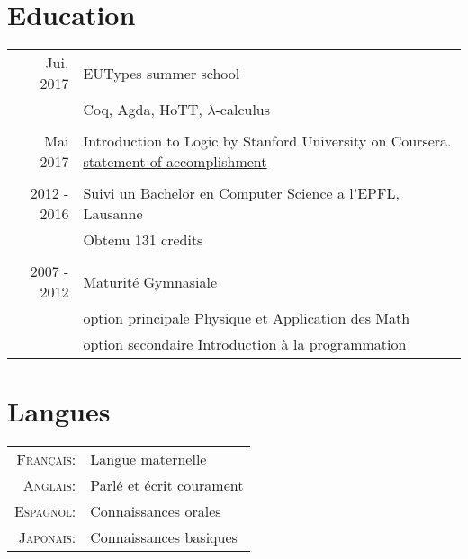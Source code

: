 \documentclass[a4paper,10pt]{article} %
\begin{document}

\section{Education}

\begin{tabular}{rl}	

Jui. 2017 & EUTypes summer school \\&\footnotesize{Coq, Agda, HoTT, $\lambda$-calculus} \\
\multicolumn{2}{c}{}\\
Mai 2017 & Introduction to Logic by Stanford University on Coursera. \footnotesize{\href{https://www.coursera.org/account/accomplishments/certificate/RPGEPLA94HFF}{statement of accomplishment}}\\
\multicolumn{2}{c}{}\\
2012 - 2016 & Suivi un Bachelor en Computer Science a l'EPFL, Lausanne\\
& \footnotesize{Obtenu 131 credits}\\
\multicolumn{2}{c}{}\\


2007 - 2012 & Maturité Gymnasiale\\ & option principale Physique et Application des Math\\ & option secondaire Introduction à la programmation\\
\end{tabular}

\renewcommand{\arraystretch}{1.2}


\section{Langues}

\begin{tabular}{rl}
\textsc{Français:} & Langue maternelle\\

\textsc{Anglais:} & Parlé et écrit courament\\

\textsc{Espagnol:} & Connaissances orales\\

\textsc{Japonais:} & Connaissances basiques\\

\end{tabular}
\end{document}

